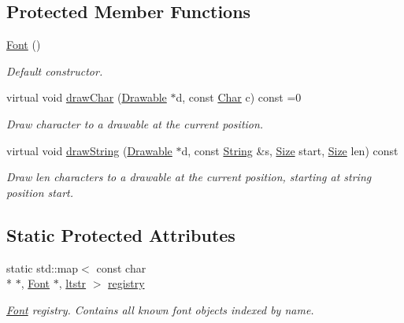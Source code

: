 \subsection*{Protected Member Functions}
\begin{DoxyCompactItemize}
\item 
\hypertarget{classGUI_1_1Font_a34f6148432a4a9aae6861d7dc15e4322}{\hyperlink{classGUI_1_1Font_a34f6148432a4a9aae6861d7dc15e4322}{Font} ()}\label{classGUI_1_1Font_a34f6148432a4a9aae6861d7dc15e4322}

\begin{DoxyCompactList}\small\item\em Default constructor. \end{DoxyCompactList}\item 
virtual void \hyperlink{classGUI_1_1Font_af7fc4fc46ef57e722d6025cdb481da18}{draw\-Char} (\hyperlink{classGUI_1_1Drawable}{Drawable} $\ast$d, const \hyperlink{namespaceGUI_af6b04b46d40197b4f00e553d7d1a3e4c}{Char} c) const =0
\begin{DoxyCompactList}\small\item\em Draw character to a drawable at the current position. \end{DoxyCompactList}\item 
virtual void \hyperlink{classGUI_1_1Font_a24b29b7c1ae28bc5cdd48f03b8ac32dc}{draw\-String} (\hyperlink{classGUI_1_1Drawable}{Drawable} $\ast$d, const \hyperlink{classGUI_1_1String}{String} \&s, \hyperlink{namespaceGUI_a10b6232e08729baa0bd211a86a69ce36}{Size} start, \hyperlink{namespaceGUI_a10b6232e08729baa0bd211a86a69ce36}{Size} len) const 
\begin{DoxyCompactList}\small\item\em Draw {\ttfamily len} characters to a drawable at the current position, starting at string position {\ttfamily start}. \end{DoxyCompactList}\end{DoxyCompactItemize}
\subsection*{Static Protected Attributes}
\begin{DoxyCompactItemize}
\item 
\hypertarget{classGUI_1_1Font_a1b293f118228367955df0b3379d3a524}{static std\-::map$<$ const char \\*
$\ast$, \hyperlink{classGUI_1_1Font}{Font} $\ast$, \hyperlink{structGUI_1_1Font_1_1ltstr}{ltstr} $>$ \hyperlink{classGUI_1_1Font_a1b293f118228367955df0b3379d3a524}{registry}}\label{classGUI_1_1Font_a1b293f118228367955df0b3379d3a524}

\begin{DoxyCompactList}\small\item\em \hyperlink{classGUI_1_1Font}{Font} registry. Contains all known font objects indexed by name. \end{DoxyCompactList}\end{DoxyCompactItemize}
